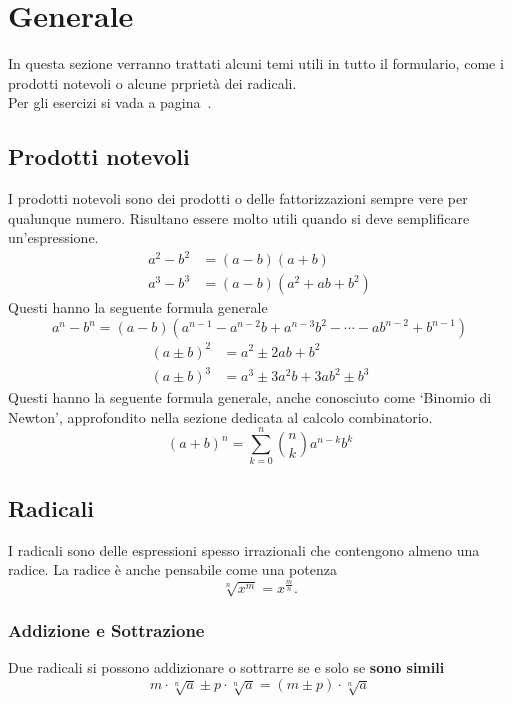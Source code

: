 
\section{Generale}\label{sec:gen}
In questa sezione verranno trattati alcuni temi utili in tutto il formulario, come i prodotti notevoli
o alcune prprietà dei radicali.\\
Per gli esercizi si vada a pagina~\pageref{ex:generale}.

\subsection{Prodotti notevoli}\label{subsec:gen:prodnot}
I prodotti notevoli sono dei prodotti o delle fattorizzazioni sempre vere per qualunque numero. 
Risultano essere molto utili quando si deve semplificare un'espressione.
\begin{align*}
  a^2 - b^2 &= (a-b)(a+b)\\
  a^3 - b^3 &= (a-b)(a^2+ab+b^2)
\end{align*}
Questi hanno la seguente formula generale
\begin{equation*}
a^n - b^n = (a-b)(a^{n-1} - a^{n-2}b + a^{n-3}b^2 - \dotsb - ab^{n-2} + b^{n-1})
\end{equation*}
\begin{align*}
  (a\pm b)^2 &= a^2 \pm 2ab + b^2 \\
  (a\pm b)^3 &= a^3 \pm 3a^2b + 3ab^2 \pm b^3
\end{align*}
Questi hanno la seguente formula generale, anche conosciuto come `Binomio di Newton', approfondito
nella sezione dedicata al calcolo combinatorio.
\begin{equation*}
(a + b)^n = \sum\limits_{k = 0}^{n}\binom{n}{k}a^{n-k}b^k
\end{equation*}

\subsection{Radicali}
I radicali sono delle espressioni spesso irrazionali che contengono almeno una radice. La radice è 
anche pensabile come una potenza
\begin{equation*}
  \sqrt[n]{x^m} = x^{\frac{m}{n}}.
\end{equation*}

\subsubsection{Addizione e Sottrazione}
Due radicali si possono addizionare o sottrarre se e solo se \textbf{sono simili}
\begin{equation*}
m\cdot\sqrt[n]{a} \pm p\cdot\sqrt[n]{a} = (m\pm p)\cdot\sqrt[n]{a}
\end{equation*}

